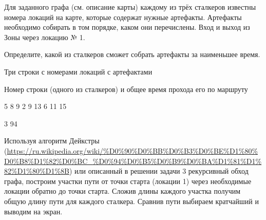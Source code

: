 
Для заданного графа (см. описание карты) каждому из трёх сталкеров известны номера локаций на карте, которые содержат нужные артефакты. Артефакты необходимо собирать в том порядке, каком они перечислены. Вход и выход из Зоны через локацию № 1.

Определите, какой из сталкеров сможет собрать артефакты за наименьшее время.


Три строки с номерами локаций с артефактами

\outputfmtSection

Номер строки (одного из сталкеров) и общее время прохода его по маршруту

\begin{myverbbox}[\small]{\vinput}
    5 8 9
    2 9 13
    6 11 15
\end{myverbbox}
\begin{myverbbox}[\small]{\voutput}
    3 94
\end{myverbbox}

\explanationSection

Используя алгоритм Дейкстры (\url{https://ru.wikipedia.org/wiki/%D0%90%D0%BB%D0%B3%D0%BE%D1%80%D0%B8%D1%82%D0%BC_}\linebreak \url{%D0%94%D0%B5%D0%B9%D0%BA%D1%81%D1%82%D1%80%D1%8B}) или описанный в решении задачи 3 рекурсивный обход графа, построим участки пути от точки старта (локации 1) через необходимые локации обратно до точки старта. Сложив длины каждого участка получим общую длину пути для каждого сталкера. Сравнив пути выбираем кратчайший и выводим на экран.